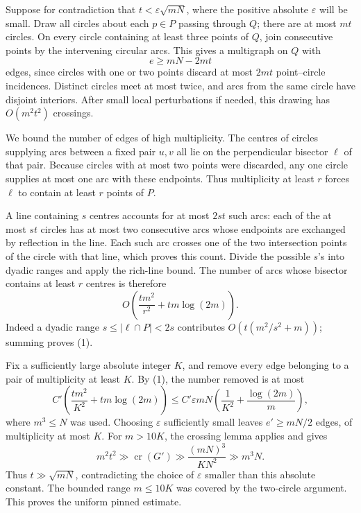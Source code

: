 Suppose for contradiction that \(t<\varepsilon\sqrt{mN}\),
where the positive absolute \(\varepsilon\) will be small.
Draw all circles about each \(p\in P\) passing through \(Q\);
there are at most \(mt\) circles.
On every circle containing at least three points of \(Q\),
join consecutive points by the intervening circular arcs.
This gives a multigraph on \(Q\) with
\[
 e\geq mN-2mt
\]
edges, since circles with one or two points discard at most \(2mt\)
point--circle incidences.
Distinct circles meet at most twice, and arcs from the same circle
have disjoint interiors. After small local perturbations if needed,
this drawing has \(O(m^2t^2)\) crossings.

We bound the number of edges of high multiplicity.
The centres of circles supplying arcs between a fixed pair \(u,v\)
all lie on the perpendicular bisector \(\ell\) of that pair.
Because circles with at most two points were discarded, any one
circle supplies at most one arc with these endpoints.
Thus multiplicity at least \(r\) forces \(\ell\) to contain at least
\(r\) points of \(P\).

A line containing \(s\) centres accounts for at most \(2st\) such
arcs: each of the at most \(st\) circles has at most two consecutive
arcs whose endpoints are exchanged by reflection in the line.
Each such arc crosses one of the two intersection points of the
circle with that line, which proves this count.
Divide the possible \(s\)'s into dyadic ranges and apply the rich-line
bound. The number of arcs whose bisector contains at least \(r\)
centres is therefore
\[
 O\left(\frac{tm^2}{r^2}+tm\log(2m)\right).                      \tag{1}
\]
Indeed a dyadic range \(s\leq|\ell\cap P|<2s\) contributes
\(O(t(m^2/s^2+m))\); summing proves (1).

Fix a sufficiently large absolute integer \(K\), and remove every
edge belonging to a pair of multiplicity at least \(K\).
By (1), the number removed is at most
\[
 C'\left(\frac{tm^2}{K^2}+tm\log(2m)\right)
 \leq C'\varepsilon mN
       \left(\frac1{K^2}+\frac{\log(2m)}m\right),
\]
where \(m^3\leq N\) was used.
Choosing \(\varepsilon\) sufficiently small leaves
\(e'\geq mN/2\) edges, of multiplicity at most \(K\).
For \(m>10K\), the crossing lemma applies and gives
\[
 m^2t^2\gg \operatorname{cr}(G')
       \gg\frac{(mN)^3}{K N^2}
       \gg m^3N.
\]
Thus \(t\gg\sqrt{mN}\), contradicting the choice of
\(\varepsilon\) smaller than this absolute constant.
The bounded range \(m\leq10K\) was covered by the two-circle argument.
This proves the uniform pinned estimate.

